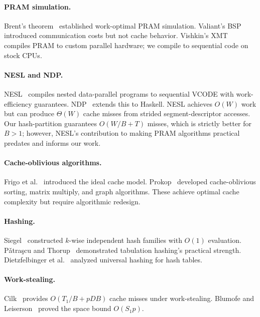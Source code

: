 \documentclass[11pt]{article}
\begin{document}
\paragraph{PRAM simulation.}
Brent's theorem~\cite{brent1974parallel} established work-optimal PRAM
simulation.  Valiant's BSP~\cite{valiant1990bridging} introduced
communication costs but not cache behavior.  Vishkin's
XMT~\cite{vishkin2011using} compiles PRAM to custom parallel hardware;
we compile to sequential code on stock CPUs.

\paragraph{NESL and NDP.}
NESL~\cite{blelloch1996programming} compiles nested data-parallel programs
to sequential VCODE with work-efficiency guarantees.
NDP~\cite{jones2008harnessing} extends this to Haskell.  NESL achieves
$O(W)$ work but can produce $\Theta(W)$ cache misses from strided
segment-descriptor accesses.  Our hash-partition guarantees $O(W/B + T)$
misses, which is strictly better for $B > 1$; however, NESL's contribution
to making PRAM algorithms practical predates and informs our work.

\paragraph{Cache-oblivious algorithms.}
Frigo et al.~\cite{frigo1999cache} introduced the ideal cache model.
Prokop~\cite{prokop1999cache} developed cache-oblivious sorting, matrix
multiply, and graph algorithms.  These achieve optimal cache complexity
but require algorithmic redesign.

\paragraph{Hashing.}
Siegel~\cite{siegel2004universal} constructed $k$-wise independent hash
families with $O(1)$ evaluation.  P\v{a}tra\c{s}cu and
Thorup~\cite{patrascu2012power} demonstrated tabulation hashing's
practical strength.  Dietzfelbinger et al.~\cite{dietzfelbinger1997reliable}
analyzed universal hashing for hash tables.

\paragraph{Work-stealing.}
Cilk~\cite{frigo1998implementation} provides $O(T_1/B + pDB)$ cache
misses under work-stealing.  Blumofe and Leiserson~\cite{blumofe1999scheduling}
proved the space bound $O(S_1 p)$.
\end{document}
